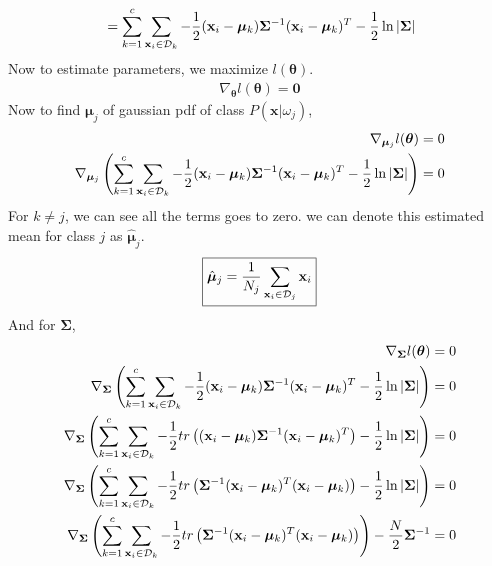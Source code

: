 \documentclass[11pt,paper=a4,answers]{exam}
\renewcommand{\vec}[1]{\mathbf{#1}}
\begin{document}
\begin{questions}
\begin{enumerate}[i.]
\begin{align*}
            &= \sum_{k=1}^c \sum_{\vec{x}_i \in \mathcal{D}_k} -{1 \over 2}(\vec{x}_i - \bm{\mu}_k) \bm{\Sigma}^{-1} (\vec{x}_i - \bm{\mu}_k)^T - {1 \over 2}\ln |\bm{\Sigma}|\\
        \end{align*}
        Now to estimate parameters, we maximize $l(\bm{\theta})$. 
        \begin{align*}
            \nabla _{\bm{\theta}} l(\bm{\theta}) = \bm{0}
        \end{align*}
        Now to find $\bm{\mu}_j$ of gaussian pdf of class $P(\vec{x}| \omega_j)$,
        \begin{align*}
            \nabla _{\bm{\mu}_j} l(\bm{\theta}) &= 0 \\
            \nabla _{\bm{\mu}_j} \left( \sum_{k=1}^c \sum_{\vec{x}_i \in \mathcal{D}_k} -{1 \over 2}(\vec{x}_i - \bm{\mu}_k) \bm{\Sigma}^{-1} (\vec{x}_i - \bm{\mu}_k)^T - {1 \over 2} \ln |\bm{\Sigma}| \right) &= 0
        \end{align*}
        For $k \neq j$, we can see all the terms goes to zero. we can denote this estimated mean for class $j$ as $\hat{\bm{\mu}}_j$.
        \begin{align}
            \boxed{\hat{\bm{\mu}}_j = {1 \over N_j} \sum_{\vec{x}_i \in \mathcal{D}_j} \vec{x}_i }
        \end{align}
        And for $\bm{\Sigma}$, 
        \begin{align*}
            \nabla _{\bm{\Sigma}} l(\bm{\theta}) &= 0 \\
            \nabla _{\bm{\Sigma}} \left( \sum_{k=1}^c \sum_{\vec{x}_i \in \mathcal{D}_k} -{1 \over 2}(\vec{x}_i - \bm{\mu}_k) \bm{\Sigma}^{-1} (\vec{x}_i - \bm{\mu}_k)^T - {1 \over 2} \ln |\bm{\Sigma}| \right) &= 0\\
            \nabla _{\bm{\Sigma}} \left( \sum_{k=1}^c \sum_{\vec{x}_i \in \mathcal{D}_k} -{1 \over 2} tr\left((\vec{x}_i - \bm{\mu}_k) \bm{\Sigma}^{-1} (\vec{x}_i - \bm{\mu}_k)^T\right) - {1 \over 2} \ln |\bm{\Sigma}| \right) &= 0\\
            \nabla _{\bm{\Sigma}} \left( \sum_{k=1}^c \sum_{\vec{x}_i \in \mathcal{D}_k} -{1 \over 2} tr\left(\bm{\Sigma}^{-1} (\vec{x}_i - \bm{\mu}_k)^T (\vec{x}_i - \bm{\mu}_k)\right) - {1 \over 2} \ln |\bm{\Sigma}| \right) &= 0 \\
            \nabla _{\bm{\Sigma}} \left( \sum_{k=1}^c \sum_{\vec{x}_i \in \mathcal{D}_k} -{1 \over 2} tr\left(\bm{\Sigma}^{-1} (\vec{x}_i - \bm{\mu}_k)^T (\vec{x}_i - \bm{\mu}_k)\right)  \right) - {N \over 2} \bm{\Sigma}^{-1} &= 0      

\end{align*}
\end{enumerate}
\end{questions}
\end{document}
